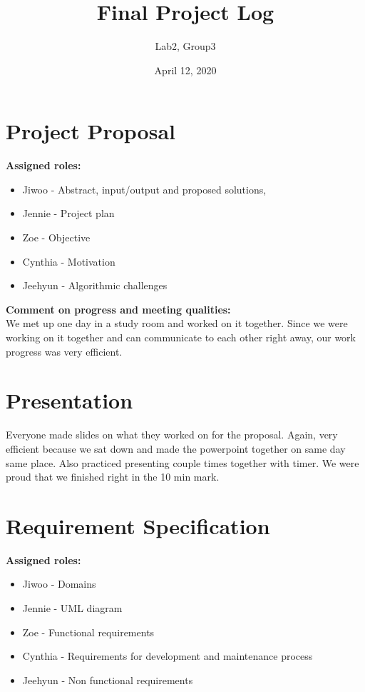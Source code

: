 \documentclass{article}
\title{Final Project Log}
\author{Lab2, Group3}
\date{April 12, 2020}
\begin{document}
\maketitle

\section{Project Proposal}

\textbf{Assigned roles: }
\begin{itemize} 
	\item Jiwoo - Abstract, input/output and proposed solutions, 
	\item Jennie - Project plan
	\item Zoe - Objective
	\item Cynthia - Motivation
	\item Jeehyun - Algorithmic challenges
\end{itemize} 

\textbf{Comment on progress and meeting qualities:} \\
We met up one day in a study room and worked on it together. Since we were working on it together and can communicate to each other right away, our work progress was very efficient.

\section{Presentation}
Everyone made slides on what they worked on for the proposal. Again, very efficient because we sat down and made the powerpoint together on same day same place. Also practiced presenting couple times together with timer. We were proud that we finished right in the 10 min mark. 

\section{Requirement Specification}
\textbf{Assigned roles: }
\begin{itemize} 
	\item Jiwoo - Domains
	\item Jennie - UML diagram
	\item Zoe - Functional requirements
	\item Cynthia - Requirements for development and maintenance process
	\item Jeehyun - Non functional requirements
\end{itemize} 
\end{document}
